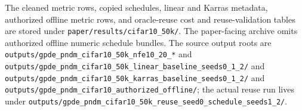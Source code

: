 The cleaned metric rows, copied schedules, linear and Karras metadata,
authorized offline metric rows, and oracle-reuse cost and reuse-validation
tables are stored under \texttt{paper/results/cifar10\_50k/}. The paper-facing
archive omits authorized offline numeric schedule bundles.
The source output roots are
\texttt{outputs/gpde\_pndm\_cifar10\_50k\_nfe10\_20\_*} and
\texttt{outputs/gpde\_pndm\_cifar10\_50k\_linear\_baseline\_seeds0\_1\_2/}
and
\texttt{outputs/gpde\_pndm\_cifar10\_50k\_karras\_baseline\_seeds0\_1\_2/}
and
\texttt{outputs/gpde\_pndm\_cifar10\_authorized\_offline/};
the actual reuse run lives under
\texttt{outputs/gpde\_pndm\_cifar10\_50k\_reuse\_seed0\_schedule\_seeds1\_2/}.
